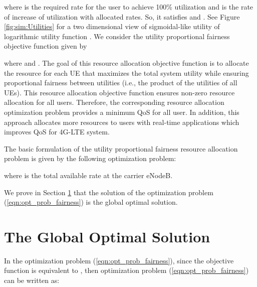 \documentclass[conference]{IEEEtran}
\begin{document}
where  is the required rate for the user to achieve 100\% utilization and  is the rate of increase of utilization with allocated rates. So, it satisfies  and . See Figure \ref{fig:sim:Utilities} for a two dimensional view of sigmoidal-like utility of logarithmic utility function . We consider the utility proportional fairness objective function given by 

where  and . The goal of this resource allocation objective function is to allocate the resource for each UE that maximizes the total system utility while ensuring proportional fairness between utilities (i.e., the product of the utilities of all UEs). This resource allocation objective function ensures non-zero resource allocation for all users. Therefore, the corresponding resource allocation optimization problem provides a minimum QoS for all user. In addition, this approach allocates more resources to users with real-time applications which improves QoS for 4G-LTE system. 

The basic formulation of the utility proportional fairness resource allocation problem is given by the following optimization problem:

where  is the total available rate at the  carrier eNodeB.

We prove in Section \ref{sec:Proof} that the solution of the optimization problem (\ref{eqn:opt_prob_fairness}) is the global optimal solution. 
\section{The Global Optimal Solution}\label{sec:Proof}

In the optimization problem (\ref{eqn:opt_prob_fairness}), since the objective function  is equivalent to , then optimization problem (\ref{eqn:opt_prob_fairness}) can be written as:
\end{document}
